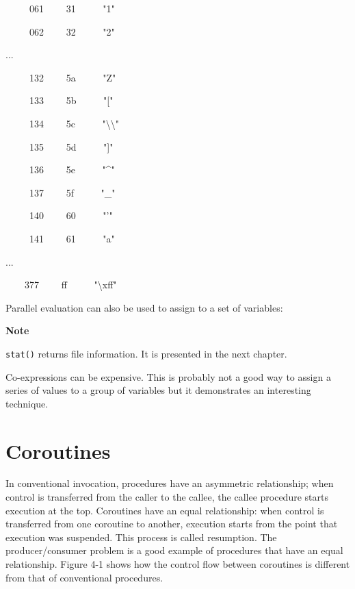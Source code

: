 { \ \ \ \ \ 061 \ \ \ \ 31 \ \ \ \ \ "1"}

{ \ \ \ \ \ 062 \ \ \ \ 32 \ \ \ \ \ "2"}

{\sffamily
...}

{ \ \ \ \ \ 132 \ \ \ \ 5a \ \ \ \ \ "Z"}

{ \ \ \ \ \ 133 \ \ \ \ 5b \ \ \ \ \ "["}

{ \ \ \ \ \ 134 \ \ \ \ 5c
\ \ \ \ \ "{\textbackslash}{\textbackslash}"}

{ \ \ \ \ \ 135 \ \ \ \ 5d \ \ \ \ \ "]"}

{ \ \ \ \ \ 136 \ \ \ \ 5e
\ \ \ \ \ "\^{}"}

{ \ \ \ \ \ 137 \ \ \ \ 5f \ \ \ \ \ "\_"}

{ \ \ \ \ \ 140 \ \ \ \ 60
\ \ \ \ \ "'"}

{ \ \ \ \ \ 141 \ \ \ \ 61 \ \ \ \ \ "a"}

{\sffamily
...}

{ \ \ \ \ 377 \ \ \ \ ff
\ \ \ \ \ "{\textbackslash}xff"}

\noindent
Parallel evaluation can also be used to assign to a set of variables:


{\sffamily\bfseries
Note}

{\sffamily
\texttt{stat()} returns file information. It is presented in the next chapter.}

\noindent
Co-expressions can be expensive. This is probably not a
good way to assign a series of values to a group of variables but it
demonstrates an interesting technique.

\section{Coroutines}

In conventional invocation, procedures have an asymmetric
relationship; when control is transferred from the caller to the
callee, the callee procedure starts execution at the top. Coroutines
have an equal relationship: when control is transferred from one
coroutine to another, execution starts from the point that
execution was suspended. This process is called resumption. The
producer/consumer problem is a good example of
procedures that have an equal relationship. Figure 4-1 shows how the
control flow between coroutines is different from that of conventional
procedures.

